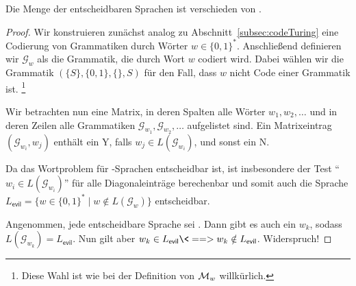 \begin{Satz}
 Die Menge der entscheidbaren Sprachen ist verschieden von .
\end{Satz}
\begin{proof}
 Wir konstruieren zunächst analog zu Abschnitt~\ref{subsec:codeTuring} eine Codierung von Grammatiken durch Wörter $w\in\{0,1\}^*$.
 Anschließend definieren wir $\mathcal{G}_w$ als die Grammatik, die durch Wort $w$ codiert wird.
 Dabei wählen wir die Grammatik $(\{S\}, \{0,1\}, \{\}, S)$
 für den Fall, dass $w$ nicht Code einer Grammatik ist.%
 \footnote{Diese Wahl ist wie bei der Definition von $\mathcal{M}_w$ willkürlich.}
 
 Wir betrachten nun eine Matrix, in deren Spalten alle Wörter $w_1,w_2,\ldots$
 und in deren Zeilen alle Grammatiken $\mathcal{G}_{w_1},\mathcal{G}_{w_2},\ldots$ aufgelistet sind.
 Ein Matrixeintrag $(\mathcal{G}_{w_i}, w_j)$ enthält ein Y, falls $w_j\in L(\mathcal{G}_{w_i})$, und sonst ein N.
 
 Da das Wortproblem für -Sprachen entscheidbar ist, ist insbesondere der Test "`$w_i\in L(\mathcal{G}_{w_i})$"'
 für alle Diagonaleinträge berechenbar und somit auch die Sprache $L_\mathsf{evil}= \{w \in\{0,1\}^* \mid w\notin L(\mathcal{G}_w)\}$ entscheidbar.
 
 Angenommen, jede entscheidbare Sprache sei .
 Dann gibt es auch ein $w_k$, sodass $L(\mathcal{G}_{w_k})=L_\mathsf{evil}$.
 Nun gilt aber $w_k\in L_\mathsf{evil} \<==> w_k\notin L_\mathsf{evil}$. Widerspruch!
\end{proof}

